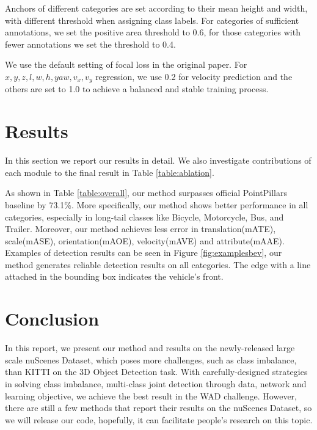 \documentclass[10pt,twocolumn,letterpaper]{article}
\begin{document}
Anchors of different categories are set according to their mean height and width, with different threshold when assigning class labels. For categories of sufficient annotations, we set the positive area threshold to 0.6, for those categories with fewer annotations we set the threshold to 0.4.

We use the default setting of focal loss in the original paper. For $x, y, z, l, w, h, yaw, v_x, v_y$ regression, we use 0.2 for velocity prediction and the others are set to 1.0 to achieve a balanced and stable training process.


\section{Results} \label{sec:results}
In this section we report our results in detail. We also investigate contributions of each module to the final result in Table \ref{table:ablation}.

As shown in Table \ref{table:overall}, our method surpasses official PointPillars \cite{pointpillars} baseline by 73.1\%. More specifically, our method shows better performance in all categories, especially in long-tail classes like Bicycle, Motorcycle, Bus, and Trailer. Moreover, our method achieves less error in translation(mATE), scale(mASE), orientation(mAOE), velocity(mAVE) and attribute(mAAE). Examples of detection results can be seen in Figure \ref{fig:examplesbev}, our method generates reliable detection results on all categories. The edge with a line attached in the bounding box indicates the vehicle's front.



\section{Conclusion} \label{sec:conclusion}

In this report, we present our method and results on the newly-released large scale nuScenes Dataset, which poses more challenges, such as class imbalance, than KITTI on the 3D Object Detection task. With carefully-designed strategies in solving class imbalance, multi-class joint detection through data, network and learning objective, we achieve the best result in the WAD challenge. However, there are still a few methods that report their results on the nuScenes Dataset, so we will release our code, hopefully, it can facilitate people's research on this topic.
\end{document}
